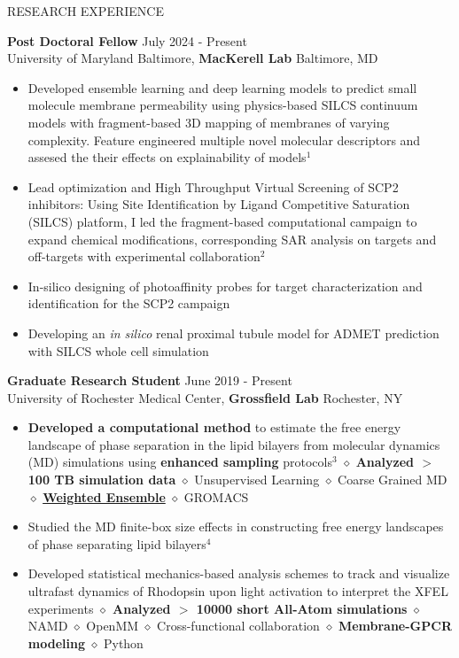 \documentclass{resume} %
\begin{document}
\begin{rSection}{RESEARCH EXPERIENCE}

   \textbf{Post Doctoral Fellow} \hfill July 2024 - Present\\
   University of Maryland Baltimore, \textbf{MacKerell Lab} \hfill Baltimore, MD
   \begin{itemize}
      \itemsep -1pt {}
      \item Developed ensemble learning and deep learning models to predict small molecule membrane permeability using physics-based SILCS continuum models with fragment-based 3D mapping of membranes of varying complexity. Feature engineered multiple novel molecular descriptors and assesed the their effects on explainability of models$^1$   
      \item Lead optimization and High Throughput Virtual Screening of SCP2 inhibitors: Using Site Identification by Ligand Competitive Saturation (SILCS) platform, I led the fragment-based computational campaign to expand chemical modifications, corresponding SAR analysis on targets and off-targets with experimental collaboration$^2$
      \item In-silico designing of photoaffinity probes for target characterization and identification for the SCP2 campaign
      \item Developing an \textit{in silico} renal proximal tubule model for ADMET prediction with SILCS whole cell simulation
   \end{itemize}

   \textbf{Graduate Research Student} \hfill June 2019 - Present\\
   University of Rochester Medical Center, \textbf{Grossfield Lab} \hfill Rochester, NY
   \begin{itemize}
      \itemsep -1pt {}
      \item \textbf{Developed a computational method} to estimate the free energy landscape of phase separation in the lipid bilayers from molecular dynamics (MD) simulations using \textbf{enhanced sampling} protocols$^{3}$
            $\diamond$ \textbf{Analyzed $>$ 100 TB simulation data} $\diamond$ Unsupervised Learning $\diamond$ Coarse Grained MD $\diamond$ \textbf{\href{https://x.com/poruthoor/status/1631815905557479426?s=20}{Weighted Ensemble}} $\diamond$ GROMACS
      \item Studied the MD finite-box size effects in constructing free energy landscapes of phase separating lipid bilayers${^4}$
      \item Developed statistical mechanics-based analysis schemes to track and visualize ultrafast dynamics of Rhodopsin upon light activation to interpret the XFEL experiments \textbf{$\diamond$ Analyzed $>$ 10000 short All-Atom simulations}
            $\diamond$ NAMD $\diamond$ OpenMM $\diamond$ Cross-functional collaboration $\diamond$  \textbf{Membrane-GPCR modeling} $\diamond$ Python
   \end{itemize}


\end{rSection}
\end{document}
